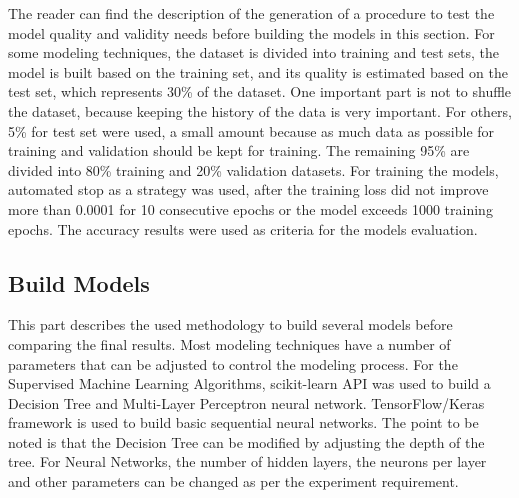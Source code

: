 The reader can find the description of the generation of a procedure to test the model quality and validity needs before building the models in this section. \newline \newline
For some modeling techniques, the dataset is divided into training and test sets, the model is built based on the training set, and its quality is estimated based on the test set, which represents 30\% of the dataset. \newline
One important part is not to shuffle the dataset, because keeping the history of the data is very important. \newline 
For others, 5\% for test set were used, a small amount because  as much data as possible for training and validation should be kept for training. The remaining 95\% are divided into 80\% training and 20\% validation datasets.\newline \newline
For training the models, automated stop as a strategy was used, after the training loss did not improve more than 0.0001 for 10 consecutive epochs or the model exceeds 1000 training epochs.\newline 
The accuracy results were used as criteria for the models evaluation.

\subsection{Build Models}

This part describes the used methodology to build several models before comparing the final results.\newline
Most modeling techniques have a number of parameters that can be adjusted to control the modeling process.\newline \newline
For the Supervised Machine Learning Algorithms, scikit-learn API was used to build a Decision Tree and Multi-Layer Perceptron neural network. TensorFlow/Keras framework is used to build basic sequential neural networks.\newline \newline
The point to be noted is that the Decision Tree can be modified by adjusting the depth of the tree. For Neural Networks,  the number of hidden layers, the neurons per layer and other parameters can be changed as per the experiment requirement.


